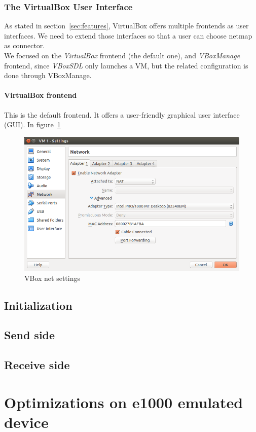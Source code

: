 \documentclass[a4paper, 12pt, titlepage]{report}
\begin{document}
\subsection{The VirtualBox User Interface}
As stated in section~\ref{sec:features}, VirtualBox offers multiple frontends as user interfaces. We need to extend those interfaces so that a user can choose netmap as connector.
\\
We focused on the \textit{VirtualBox} frontend (the default one), and \textit{VBoxManage} frontend, since \textit{VBoxSDL} only launches a VM, but the related configuration is done through VBoxManage.

\subsubsection{VirtualBox frontend}
This is the default frontend. It offers a user-friendly graphical user interface (GUI). In figure~\ref{img:vbox_net_settings} 
\begin{figure}[!h] \label{img:vbox_net_settings}
	\centering
	\includegraphics[width=\textwidth]{img/net_settings.png}
	\caption{VBox net settings}
\end{figure}
\section{Initialization}
\section{Send side}
\section{Receive side}
\chapter{Optimizations on e1000 emulated device}
\end{document}
